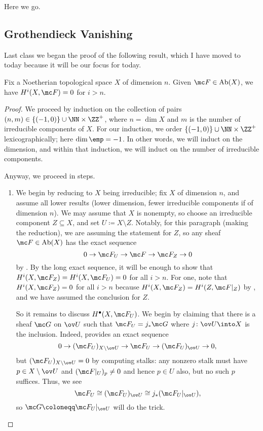 \documentclass[../notes.tex]{subfiles}
\begin{document}
Here we go.

\subsection{Grothendieck Vanishing}
Last class we began the proof of the following result, which I have moved to today because it will be our focus for today.
\begin{theorem} \label{thm:gr-van}
	Fix a Noetherian topological space $X$ of dimension $n$. Given $\mc F\in\mathrm{Ab}(X)$, we have $H^i(X,\mc F)=0$ for $i>n$.
\end{theorem}
\begin{proof}
	We proceed by induction on the collection of pairs $(n,m)\in\{(-1,0)\}\cup\NN\times\ZZ^+$, where $n=\dim X$ and $m$ is the number of irreducible components of $X$. For our induction, we order $\{(-1,0)\}\cup\NN\times\ZZ^+$ lexicographically; here $\dim\emp=-1$. In other words, we will induct on the dimension, and within that induction, we will induct on the number of irreducible components. %

	Anyway, we proceed in steps.
	\begin{enumerate}
		\item We begin by reducing to $X$ being irreducible; fix $X$ of dimension $n$, and assume all lower results (lower dimension, fewer irreducible components if of dimension $n$). We may assume that $X$ is nonempty, so choose an irreducible component $Z\subseteq X$, and set $U\coloneqq X\setminus Z$. Notably, for this paragraph (making the reduction), we are assuming the statement for $Z$, so any sheaf $\mc F\in\mathrm{Ab}(X)$ has the exact sequence
		\[0\to\mc F_U\to\mc F\to\mc F_Z\to0\]
		by . By the long exact sequence, it will be enough to show that $H^i(X,\mc F_Z)=H^i(X,\mc F_U)=0$ for all $i>n$. For one, note that $H^i(X,\mc F_Z)=0$ for all $i>n$ because $H^i(X,\mc F_Z)=H^i(Z,\mc F|_Z)$ by , and we have assumed the conclusion for $Z$.
		
		So it remains to discuss $H^\bullet(X,\mc F_U)$. We begin by claiming that there is a sheaf $\mc G$ on $\ov U$ such that $\mc F_U=j_*\mc G$ where $j\colon\ov U\into X$ is the inclusion. Indeed,  provides an exact sequence
		\[0\to(\mc F_U)_{X\setminus\ov U}\to\mc F_U\to(\mc F_U)_{\ov U}\to0,\]
		but $(\mc F_U)_{X\setminus\ov U}=0$ by computing stalks: any nonzero stalk must have $p\in X\setminus\ov U$ and $(\mc F|_U)_p\ne0$ and hence $p\in U$ also, but no such $p$ suffices. Thus, we see
		\[\mc F_U\cong(\mc F_U)_{\ov U}\cong j_*(\mc F_U|_{\ov U}),\]
		so $\mc G\coloneqq\mc F_U|_{\ov U}$ will do the trick.


\end{enumerate}
\end{proof}
\end{document}
